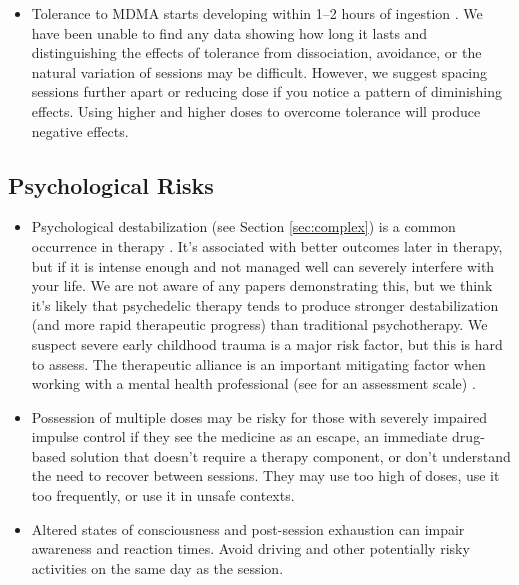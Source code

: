 \documentclass[12pt,letterpaper]{book}
\begin{document}
\begin{itemize}
    \item Tolerance to MDMA starts developing within 1–2 hours of ingestion \cite{farreTolerance,parrottTolerance}. We have been unable to find any data showing how long it lasts and distinguishing the effects of tolerance from dissociation, avoidance, or the natural variation of sessions may be difficult. However, we suggest spacing sessions further apart or reducing dose if you notice a pattern of diminishing effects. Using higher and higher doses to overcome tolerance will produce negative effects.
\end{itemize}
\subsection*{Psychological Risks}
\begin{itemize}
    \item Psychological destabilization (see Section \ref{sec:complex}) is a common occurrence in therapy \cite{olthofDestabilization}. It's associated with better outcomes later in therapy, but if it is intense enough and not managed well can severely interfere with your life. We are not aware of any papers demonstrating this, but we think it's likely that psychedelic therapy tends to produce stronger destabilization (and more rapid therapeutic progress) than traditional psychotherapy. We suspect severe early childhood trauma is a major risk factor, but this is hard to assess. The therapeutic alliance is an important mitigating factor when working with a mental health professional (see \textcite{BRWAIdownload} for an assessment scale) \cite{fluckiger2018alliance}.
    \item Possession of multiple doses may be risky for those with severely impaired impulse control if they see the medicine as an escape, an immediate drug-based solution that doesn't require a therapy component, or don't understand the need to recover between sessions. They may use too high of doses, use it too frequently, or use it in unsafe contexts.
    \item Altered states of consciousness and post-session exhaustion can impair awareness and reaction times. Avoid driving and other potentially risky activities on the same day as the session.

\end{itemize}
\end{document}
